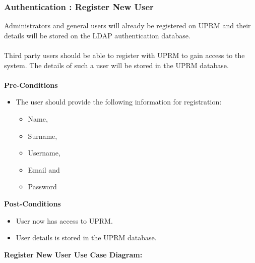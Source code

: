 \subsubsection{Authentication : Register New User}
Administrators and general users will already be registered on UPRM and their details will be stored on the LDAP authentication database.\\ \\
Third party users should be able to register with UPRM to gain access to the system. The details of such a user will be stored in the UPRM database.\\ \\
\textbf{Pre-Conditions}
\begin{itemize}
	\item The user should provide the following information for registration:
	\begin{itemize}
		\item Name,
		\item Surname,
		\item Username,
		\item Email and
		\item Password \\
	\end{itemize}
\end{itemize}
\textbf{Post-Conditions}
\begin{itemize}
	\item User now has access to UPRM.
	\item User details is stored in the UPRM database.\\
\end{itemize}
\textbf{Register New User Use Case Diagram:}\\
\centerline{}

